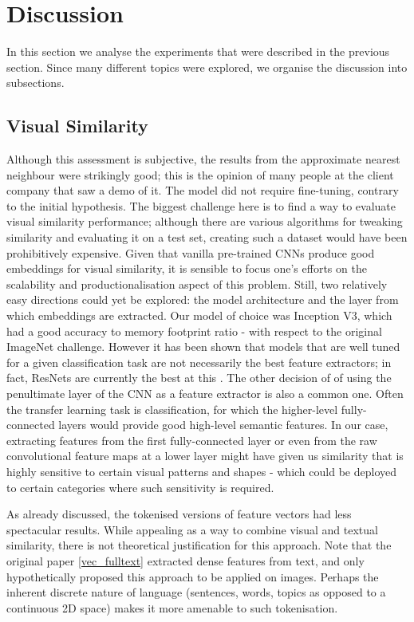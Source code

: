 \chapter{Discussion}
\label{disc}

In this section we analyse the experiments that were described in the previous section.
Since many different topics were explored, we organise the discussion into subsections.

\section{Visual Similarity}

Although this assessment is subjective, the results from the approximate nearest neighbour were strikingly good; this is the opinion of many people at the client company that saw a demo of it.
The model did not require fine-tuning, contrary to the initial hypothesis.
The biggest challenge here is to find a way to evaluate visual similarity performance; although there are various algorithms for tweaking similarity and evaluating it on a test set, creating such a dataset would have been prohibitively expensive.
Given that vanilla pre-trained CNNs produce good embeddings for visual similarity, it is sensible to focus one's efforts on the scalability and productionalisation aspect of this problem.
Still, two relatively easy directions could yet be explored: the model architecture and the layer from which embeddings are extracted.
Our model of choice was Inception V3, which had a good accuracy to memory footprint ratio - with respect to the original ImageNet challenge.
However it has been shown that models that are well tuned for a given classification task are not necessarily the best feature extractors; in fact, ResNets are currently the best at this \cite{img_feature_extract}.
The other decision of of using the penultimate layer of the CNN as a feature extractor is also a common one.
Often the transfer learning task is classification, for which the higher-level fully-connected layers would provide good high-level semantic features.
In our case, extracting features from the first fully-connected layer or even from the raw convolutional feature maps at a lower layer might have given us similarity that is highly sensitive to certain visual patterns and shapes - which could be deployed to certain categories where such sensitivity is required.

As already discussed, the tokenised versions of feature vectors had less spectacular results.
While appealing as a way to combine visual and textual similarity, there is not theoretical justification for this approach.
Note that the original paper \ref{vec_fulltext} extracted dense features from text, and only hypothetically proposed this approach to be applied on images.
Perhaps the inherent discrete nature of language (sentences, words, topics as opposed to a continuous 2D space)  makes it more amenable to such tokenisation.

